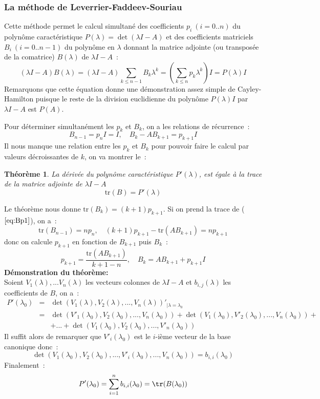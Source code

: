 \documentclass[a4paper,11pt]{article}
\newtheorem{thm}{Théorème}
\begin{document}
\begin{giacjshere}
\subsubsection{La m\'ethode de
  Leverrier-Faddeev-Souriau} 
Cette m\'ethode permet le calcul simultan\'e des coefficients 
$p_i \ (i=0..n)$ du polyn\^ome caract\'eristique 
$P(\lambda)=\det(\lambda I-A)$  et des coefficients matriciels
$B_i \ (i=0..n-1)$ du polyn\^ome en $\lambda$ donnant la matrice adjointe
(ou transpos\'ee de la comatrice) $B(\lambda)$ de $\lambda I -A$~:
\begin{equation} \label{eq:Bp}
 (\lambda I -A)B(\lambda)=(\lambda I -A) \sum_{k\leq n-1} B_k \lambda^k
= (\sum_{k\leq n} p_k \lambda^k)I =P(\lambda)I
\end{equation}
Remarquons que cette équation donne une démonstration assez simple
de Cayley-Hamilton puisque le reste de la division euclidienne
du polynôme $P(\lambda)I$ par $\lambda I -A $ est $P(A)$.

Pour déterminer simultanément les $p_k$ et $B_k$,
on a les relations de récurrence~:
\begin{equation}
\label{eq:Bp1} B_{n-1}=p_n I=I, \quad B_k-AB_{k+1}=p_{k+1} I
\end{equation}
Il nous manque une relation entre les $p_k$ et $B_k$ pour pouvoir
faire le calcul par valeurs décroissantes de $k$, on va montrer le~:
\begin{thm}
La d\'eriv\'ee  du polyn\^ome caract\'eristique $P'(\lambda)$,
est \'egale \`a la trace de la matrice adjointe 
de $\lambda I-A$
\[ \mbox{tr}(B)=P'(\lambda) \]
\end{thm}
Le théorème nous donne $\mbox{tr}(B_k) = (k+1)p_{k+1} $.
Si on prend la trace de (\(\ref{eq:Bp1}\)), on a~:
\[ \mbox{tr}(B_{n-1})=n p_n, \quad (k+1)p_{k+1} -\mbox{tr}(AB_{k+1})
=np_{k+1} \]
donc on calcule $p_{k+1}$ en fonction de $B_{k+1}$ puis $B_k$~:
\[ p_{k+1}=\frac{\mbox{tr}(AB_{k+1})}{k+1-n}, 
\quad B_k=AB_{k+1}+p_{k+1} I \]
{\bf D\'emonstration du théorème:}\\
Soient $V_1(\lambda),...V_n(\lambda)$ les vecteurs colonnes 
de $\lambda I-A$ et $b_{i,j}(\lambda)$ les coefficients de $B$, on a~:
\begin{eqnarray*}
P'(\lambda_0) &=& \det(V_1(\lambda),V_2(\lambda),...,V_n(\lambda) )'
_{|\lambda=\lambda_0}\\
&=&\det(V'_1(\lambda_0),V_2(\lambda_0),...,V_n(\lambda_0) )+
\det(V_1(\lambda_0),V'_2(\lambda_0),...,V_n(\lambda_0) )+ \\
& & +...+\det(V_1(\lambda_0),V_2(\lambda_0),...,V'_n(\lambda_0) )
\end{eqnarray*}
Il suffit alors de remarquer que
$V'_i(\lambda_0)$ est le $i$-ième vecteur de la base canonique donc~:
\[ \det(V_1(\lambda_0),V_2(\lambda_0),...,V'_i(\lambda_0),...,V_n(\lambda_0) )
=b_{i,i}(\lambda_0) \]
Finalement~:
\[P'(\lambda_0)=\sum_{i=1}^n b_{i,i}(\lambda_0)=\tr(B(\lambda_0)) \]


\end{giacjshere}
\end{document}

